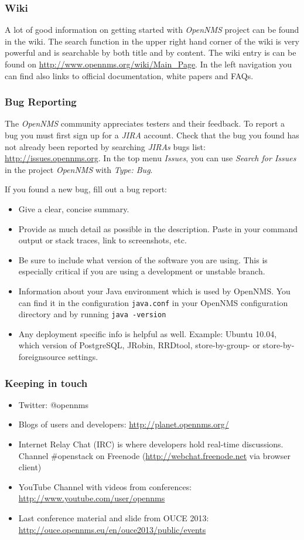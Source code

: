 \subsubsection{Wiki}
A lot of good information on getting started with \emph{OpenNMS} project can be found in the wiki. The search function in the upper right hand corner of the wiki is very powerful and is searchable by both title and by content. The wiki entry is can be found on \url{http://www.opennms.org/wiki/Main_Page}. In the left navigation you can find also links to official documentation, white papers and FAQs.

\subsubsection{Bug Reporting}
The \emph{OpenNMS} community appreciates testers and their feedback. To report a bug you must first sign up for a \emph{JIRA} account.
Check that the bug you found has not already been reported by searching \emph{JIRAs} bugs list: \url{http://issues.opennms.org}. In the top menu \emph{Issues}, you can use \emph{Search for Issues} in the project \emph{OpenNMS} with \emph{Type: Bug}.

If you found a new bug, fill out a bug report:
\begin{itemize}
  \item Give a clear, concise summary.
  \item Provide as much detail as possible in the description. Paste in your command output or stack traces, link to screenshots, etc.
  \item Be sure to include what version of the software you are using. This is especially critical if you are using a development or unstable branch.
  \item Information about your Java environment which is used by OpenNMS. You can find it in the configuration \texttt{java.conf} in your OpenNMS configuration directory and by running \texttt{java -version} 
  \item Any deployment specific info is helpful as well. Example: Ubuntu 10.04, which version of PostgreSQL, JRobin, RRDtool, store-by-group- or store-by-foreignsource settings.
\end{itemize}

\subsubsection{Keeping in touch}
\begin{itemize}
  \item Twitter: @opennms
  \item Blogs of users and developers: \url{http://planet.opennms.org/}
  \item Internet Relay Chat (IRC) is where developers hold real-time discussions. Channel \#openstack on Freenode (\url{http://webchat.freenode.net} via browser client)
  \item YouTube Channel with videos from conferences: \url{http://www.youtube.com/user/opennms}
  \item Last conference material and slide from OUCE 2013: \url{http://ouce.opennms.eu/en/ouce2013/public/events}
\end{itemize}

